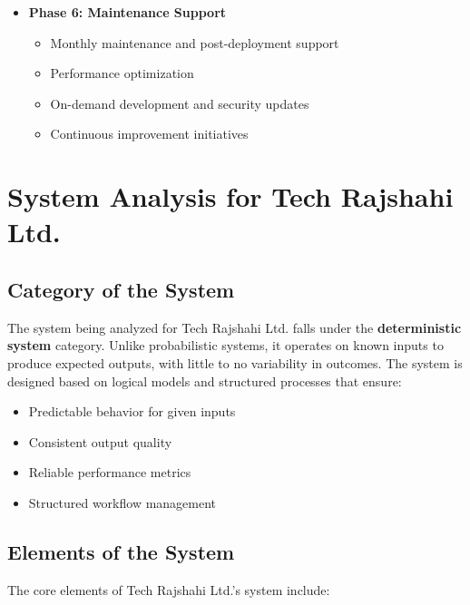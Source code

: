 \documentclass[12pt,a4paper]{article}
\begin{document}
\begin{itemize}
    \item \textbf{Phase 6: Maintenance Support}
    \begin{itemize}
        \item Monthly maintenance and post-deployment support
        \item Performance optimization
        \item On-demand development and security updates
        \item Continuous improvement initiatives
    \end{itemize}
\end{itemize}

\section{System Analysis for Tech Rajshahi Ltd.}

\subsection{Category of the System}
The system being analyzed for Tech Rajshahi Ltd. falls under the \textbf{deterministic system} category. Unlike probabilistic systems, it operates on known inputs to produce expected outputs, with little to no variability in outcomes. The system is designed based on logical models and structured processes that ensure:

\begin{itemize}
    \item Predictable behavior for given inputs
    \item Consistent output quality
    \item Reliable performance metrics
    \item Structured workflow management
\end{itemize}

\subsection{Elements of the System}
The core elements of Tech Rajshahi Ltd.'s system include:
\end{document}
